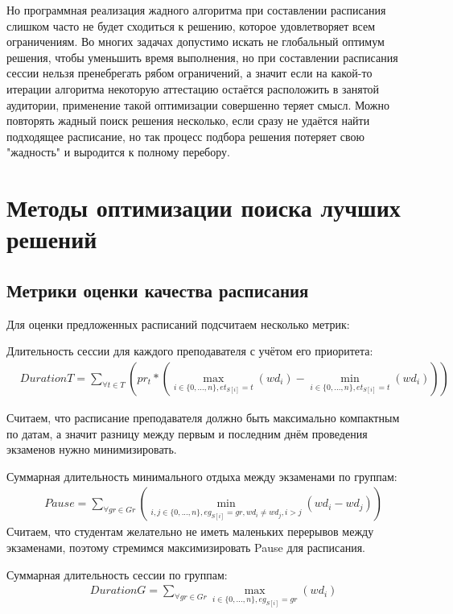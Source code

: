 Но программная реализация жадного алгоритма при составлении расписания слишком часто не будет сходиться к решению, которое удовлетворяет всем ограничениям. Во многих задачах допустимо искать не глобальный оптимум решения, чтобы уменьшить время выполнения, но при составлении расписания сессии нельзя пренебрегать рябом ограничений, а значит если на какой-то итерации алгоритма некоторую аттестацию остаётся расположить в занятой аудитории, применение такой оптимизации совершенно теряет смысл. Можно повторять жадный поиск решения несколько, если сразу не удаётся найти подходящее расписание, но так процесс подбора решения потеряет свою "жадность" и выродится к полному перебору.

\section{Методы оптимизации поиска лучших решений} \label{ch2:sec4} 
\subsection{Метрики оценки качества расписания}\label{subsec:quality-func}
Для оценки предложенных расписаний подсчитаем несколько метрик:

Длительность сессии для каждого преподавателя с учётом его приоритета:
\begin{align}
	& {DurationT} =  \sum\limits_{\forall  t \in T}(pr_t* (\max\limits_{i \in \{0,...,n\}, et_{S[i]} = t}(wd_{i}) 
	- \min\limits_{i \in \{0,...,n\}, et_{S[i]} = t}(wd_{i}) )) 
\end{align}

Считаем, что расписание преподавателя должно быть максимально компактным по датам, а значит разницу между первым и последним днём проведения экзаменов нужно минимизировать.

Суммарная длительность минимального отдыха между экзаменами по группам:
\begin{align}
	& {Pause} =  \sum\limits_{\forall  gr \in Gr}(\min\limits_{i,j \in \{0,...,n\}, eg_{S[i]} = gr, wd_i \neq wd_j, i>j}(wd_i - wd_j))
\end{align}
Считаем, что студентам желательно не иметь маленьких перерывов между экзаменами, поэтому стремимся максимизировать Pause для расписания.

Суммарная длительность сессии по группам:
\begin{align}
	& {DurationG} =  \sum\limits_{\forall  gr \in Gr}\max\limits_{i \in \{0,...,n\}, eg_{S[i]} = gr}(wd_i)
\end{align}

